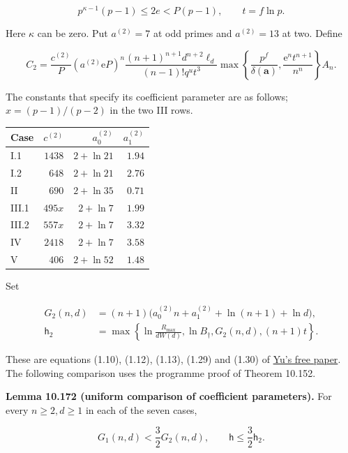 \documentclass[
  11pt,
  a4paper,
]{article}
\newcounter{none} %
\begin{document}
\[
p^{\kappa-1}(p-1)\le2e<P(p-1),
\qquad t=f\ln p.
\tag{10.641}
\]

Here \(\kappa\) can be zero. Put \(a^{(2)}=7\) at odd primes and
\(a^{(2)}=13\) at two. Define

\[
C_2=\frac{c^{(2)}}P(a^{(2)}\mathrm eP)^n
\frac{(n+1)^{n+1}d^{n+2}\ell_d}{(n-1)!q^ut^3}
\max\left\{\frac{p^f}{\delta(\boldsymbol a)},
                  \frac{\mathrm e^nt^{n+1}}{n^n}\right\}A_n.
\tag{10.642}
\]

The constants that specify its coefficient parameter are as follows;
\(x=(p-1)/(p-2)\) in the two III rows.

{\def\LTcaptype{none} %
\begin{longtable}[]{@{}lrrr@{}}
\toprule\noalign{}
Case & \(c^{(2)}\) & \(a_0^{(2)}\) & \(a_1^{(2)}\) \\
\midrule\noalign{}
\endhead
\bottomrule\noalign{}
\endlastfoot
I.1 & \(1438\) & \(2+\ln21\) & \(1.94\) \\
I.2 & \(648\) & \(2+\ln21\) & \(2.76\) \\
II & \(690\) & \(2+\ln35\) & \(0.71\) \\
III.1 & \(495x\) & \(2+\ln7\) & \(1.99\) \\
III.2 & \(557x\) & \(2+\ln7\) & \(3.32\) \\
IV & \(2418\) & \(2+\ln7\) & \(3.58\) \\
V & \(406\) & \(2+\ln52\) & \(1.48\) \\
\end{longtable}
}

Set

\[
\begin{aligned}
G_2(n,d)&=(n+1)\bigl(a_0^{(2)}n+a_1^{(2)}+\ln(n+1)+\ln d\bigr),\\
\mathsf h_2&=\max\left\{\ln\frac{R_{\max}}{dW(d)},
                 \ln B_\dagger,G_2(n,d),(n+1)t\right\}.
\end{aligned}
\tag{10.643}
\]

These are equations (1.10), (1.12), (1.13), (1.29) and (1.30) of
\href{https://archive.ymsc.tsinghua.edu.cn/pacm_download/117/6782-11511_2013_Article_106.pdf}{Yu's
free paper}. The following comparison uses the programme proof of
Theorem 10.152.

\textbf{Lemma 10.172 (uniform comparison of coefficient parameters).}
For every \(n\ge2,d\ge1\) in each of the seven cases,

\[
G_1(n,d)<\frac32G_2(n,d),\qquad
\mathsf h\le\frac32\mathsf h_2.
\tag{10.644}
\]
\end{document}
